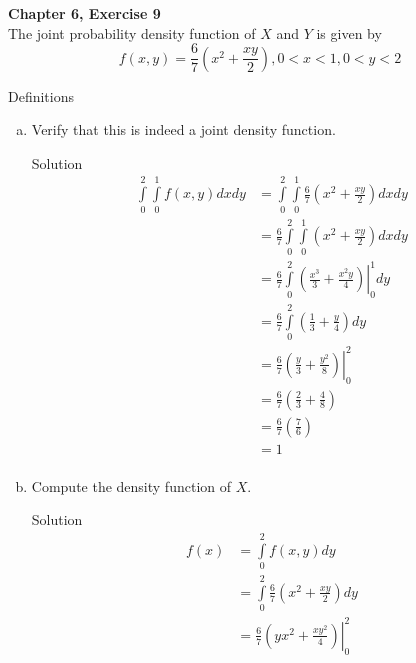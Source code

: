 \documentclass{article}
\begin{document}
\begin{spacing}{1.1}
\newpage
\begin{homeworkProblem}
  {\bf Chapter 6, Exercise 9}\\
  The joint probability density function of $X$ and $Y$ is given by
  \[f( x, y) = \frac{ 6}{ 7} \left(x^2 + \frac{ x y}{ 2}\right), 
    0 < x < 1, 0 < y < 2\]

  \begin{homeworkSection}{Definitions}

  \end{homeworkSection}
  \begin{enumerate}[(a)]
    \item Verify that this is indeed a joint density function.
      \begin{homeworkSection}{Solution}
        \begin{align*}
          \int\limits_0^2 \int\limits_0^1 f( x, y) dx dy &= 
            \int\limits_0^2 \int\limits_0^1 \frac{ 6}{ 7} 
              \left(x^2 + \frac{ x y}{ 2}\right) dx dy\\
          &= \frac{ 6}{ 7} \int\limits_0^2 \int\limits_0^1 
            \left(x^2 + \frac{ x y}{ 2}\right) dx dy\\
          &= \frac{ 6}{ 7} \int\limits_0^2
            \left.\left(\frac{ x^3}{ 3} + \frac{ x^2 y}{ 4}\right)\right|_0^1 dy\\
          &= \frac{ 6}{ 7} \int\limits_0^2
            \left(\frac{ 1}{ 3} + \frac{ y}{ 4}\right) dy\\
          &= \frac{ 6}{ 7}
            \left.\left(\frac{ y}{ 3} + \frac{ y^2}{ 8}\right)\right|_0^2\\
          &= \frac{ 6}{ 7} \left(\frac{ 2}{ 3} + \frac{ 4}{ 8}\right)\\
          &= \frac{ 6}{ 7} \left(\frac{ 7}{ 6}\right)\\
          &= 1\\
        \end{align*}
      \end{homeworkSection}
    \item Compute the density function of $X$.
      \begin{homeworkSection}{Solution}
        \begin{align*}
          f(x) &= \int\limits_0^2 f(x, y) dy\\
          &= \int\limits_0^2 \frac{ 6}{ 7} \left(x^2 + \frac{ x y}{ 2}\right) dy\\
          &= \left.\frac{ 6}{ 7} \left(y x^2 + \frac{ x y^2}{ 4}\right)\right|_0^2\\

\end{align*}
\end{homeworkSection}
\end{enumerate}
\end{homeworkProblem}
\end{spacing}
\end{document}
